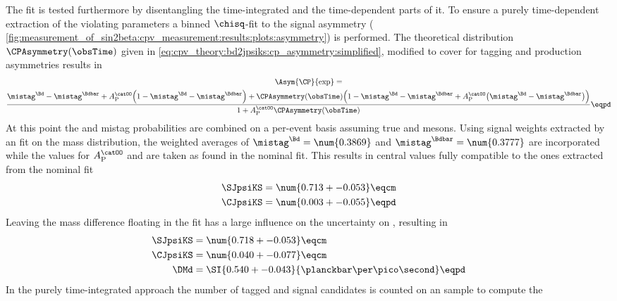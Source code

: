 The fit is tested furthermore by disentangling the time-integrated and the
time-dependent parts of it. To ensure a purely time-dependent extraction of the
\CP violating parameters a binned $\chisq$-fit to the signal \CP asymmetry (\cf
\cref{fig:measurement_of_sin2beta:cpv_measurement:results:plots:asymmetry}) is
performed. The theoretical distribution $\CPAsymmetry(\obsTime)$ given in
\cref{eq:cpv_theory:bd2jpsiks:cp_asymmetry:simplified}, modified to cover for
tagging and production asymmetries results in
%
\begin{multline}
  \Asym{\CP}{\text{exp}} = \\
    \frac{\mistag^{\Bd} - \mistag^{\Bdbar} + A_{\text{P}}^{\catOO} \Bigl(1 - \mistag^{\Bd} - \mistag^{\Bdbar}\Bigr) + \CPAsymmetry(\obsTime) \Bigl(1 - \mistag^{\Bd} - \mistag^{\Bdbar} + A_{\text{P}}^{\catOO} \bigl(\mistag^{\Bd} - \mistag^{\Bdbar}\bigr) \Bigr)}
    {1 + A_{\text{P}}^{\catOO} \CPAsymmetry(\obsTime) } \eqpd
\end{multline}
%
At this point the \OS and \SSpi mistag probabilities are combined on a per-event
basis assuming true \Bd and \Bdbar mesons. Using signal weights extracted by an
\sPlot fit on the mass distribution, the weighted averages of $\mistag^{\Bd} =
\num{0.3869}$ and $\mistag^{\Bdbar} = \num{0.3777}$ are incorporated while the
values for $A_{\text{P}}^{\catOO}$ and \DMd are taken as found in the nominal
fit. This results in central values fully compatible to the ones extracted from
the nominal fit
%
\begin{equation*}
  \begin{split}
    \SJpsiKS &= \num{0.713 +- 0.053} \eqcm \\
    \CJpsiKS &= \num{0.003 +- 0.055} \eqpd
  \end{split}
\end{equation*}
%
Leaving the mass difference \DMd floating in the fit has a large influence on
the uncertainty on \CJpsiKS, resulting in
%
\begin{equation*}
  \begin{split}
    \SJpsiKS &= \num{0.718 +- 0.053} \eqcm \\
    \CJpsiKS &= \num{0.040 +- 0.077} \eqcm \\
    \DMd     &= \SI{0.540 +- 0.043}{\planckbar\per\pico\second} \eqpd
  \end{split}
\end{equation*}
%
In the purely time-integrated approach the number of tagged \Bd and \Bdbar
signal candidates is counted on an \sweighted sample to compute the
